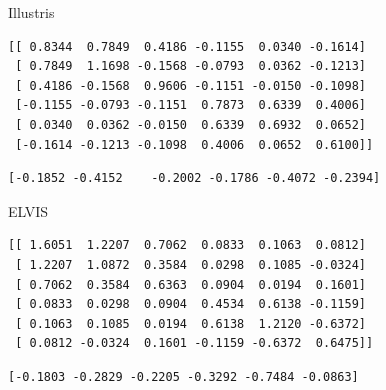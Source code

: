 \documentclass[a4paper,fleqn,usenatbib]{mnras}
\begin{document}
Illustris
\begin{verbatim}
[[ 0.8344  0.7849  0.4186 -0.1155  0.0340 -0.1614]
 [ 0.7849  1.1698 -0.1568 -0.0793  0.0362 -0.1213]
 [ 0.4186 -0.1568  0.9606 -0.1151 -0.0150 -0.1098]
 [-0.1155 -0.0793 -0.1151  0.7873  0.6339  0.4006]
 [ 0.0340  0.0362 -0.0150  0.6339  0.6932  0.0652]
 [-0.1614 -0.1213 -0.1098  0.4006  0.0652  0.6100]]
\end{verbatim}

\begin{verbatim}
[-0.1852 -0.4152    -0.2002 -0.1786 -0.4072 -0.2394]
\end{verbatim}

ELVIS
\begin{verbatim}
[[ 1.6051  1.2207  0.7062  0.0833  0.1063  0.0812]
 [ 1.2207  1.0872  0.3584  0.0298  0.1085 -0.0324]
 [ 0.7062  0.3584  0.6363  0.0904  0.0194  0.1601]
 [ 0.0833  0.0298  0.0904  0.4534  0.6138 -0.1159]
 [ 0.1063  0.1085  0.0194  0.6138  1.2120 -0.6372]
 [ 0.0812 -0.0324  0.1601 -0.1159 -0.6372  0.6475]]
\end{verbatim}

\begin{verbatim}
[-0.1803 -0.2829 -0.2205 -0.3292 -0.7484 -0.0863]
\end{verbatim}
\end{document}
